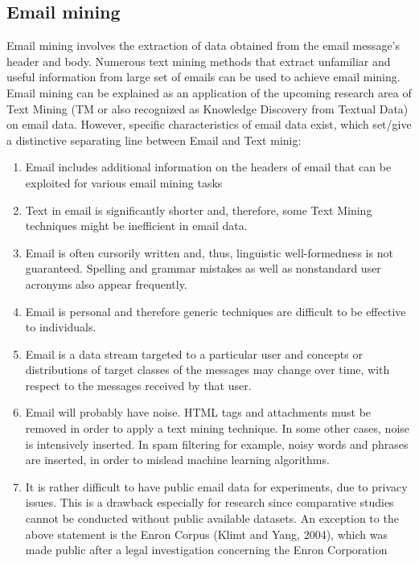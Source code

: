\documentclass[10pt,twoside,english,a4paper]{article}
\begin{document}
\subsection{Email mining} \label{mining}
Email mining involves the extraction of data obtained from the email message's header and body. Numerous text mining methods that extract unfamiliar and useful information from large set of emails can be used to achieve email mining. Email mining can be explained as an application of the upcoming research area of Text Mining (TM or also recognized as Knowledge Discovery from Textual Data) on email data.
However, specific characteristics of email data exist, which set/give a distinctive separating line between Email and Text minig:

\begin{enumerate}
\item Email includes additional information on the headers of email that can be exploited for various email mining tasks
\item Text in email is significantly shorter and, therefore, some Text Mining techniques might be inefficient in email data.
\item Email is often cursorily written and, thus, linguistic well-formedness is not guaranteed. Spelling and grammar mistakes as well as nonstandard user acronyms also appear
frequently.
\item Email is personal and therefore generic techniques are difficult to be effective to individuals.
\item Email is a data stream targeted to a particular user and concepts or distributions of target classes of the messages may change over time, with respect to the messages received by that user.
\item Email will probably have noise. HTML tags and attachments must be removed in order to apply a text mining technique. In some other cases, noise is intensively inserted. In spam filtering for example, noisy words and phrases are inserted, in order to mislead machine learning algorithms.
\item It is rather difficult to have public email data for experiments, due to privacy issues. This is a drawback especially for research since comparative studies cannot be conducted without public available datasets. An exception to the above statement is the Enron Corpus (Klimt and Yang, 2004), which was made public after a legal investigation concerning the Enron Corporation
\end{enumerate}
\end{document}
